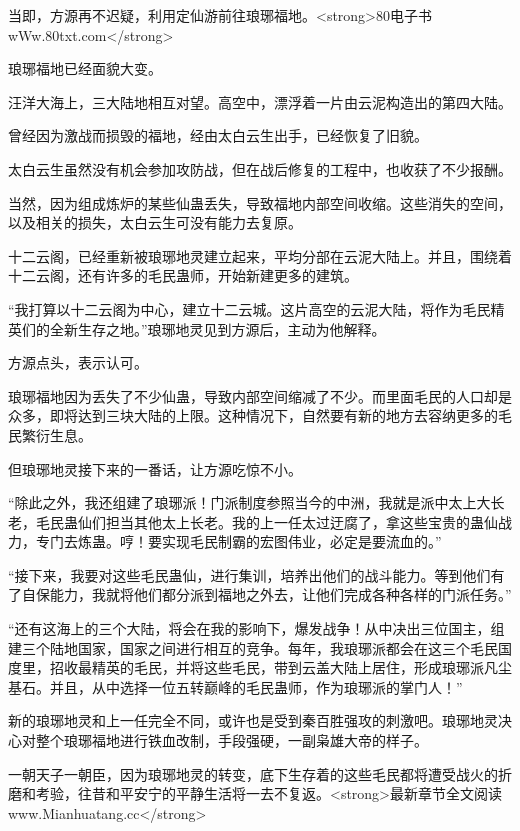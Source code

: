 
\begin{this_body}

当即，方源再不迟疑，利用定仙游前往琅琊福地。<strong>80电子书wWw.80txt.com</strong>

琅琊福地已经面貌大变。

汪洋大海上，三大陆地相互对望。高空中，漂浮着一片由云泥构造出的第四大陆。

曾经因为激战而损毁的福地，经由太白云生出手，已经恢复了旧貌。

太白云生虽然没有机会参加攻防战，但在战后修复的工程中，也收获了不少报酬。

当然，因为组成炼炉的某些仙蛊丢失，导致福地内部空间收缩。这些消失的空间，以及相关的损失，太白云生可没有能力去复原。

十二云阁，已经重新被琅琊地灵建立起来，平均分部在云泥大陆上。并且，围绕着十二云阁，还有许多的毛民蛊师，开始新建更多的建筑。

“我打算以十二云阁为中心，建立十二云城。这片高空的云泥大陆，将作为毛民精英们的全新生存之地。”琅琊地灵见到方源后，主动为他解释。

方源点头，表示认可。

琅琊福地因为丢失了不少仙蛊，导致内部空间缩减了不少。而里面毛民的人口却是众多，即将达到三块大陆的上限。这种情况下，自然要有新的地方去容纳更多的毛民繁衍生息。

但琅琊地灵接下来的一番话，让方源吃惊不小。

“除此之外，我还组建了琅琊派！门派制度参照当今的中洲，我就是派中太上大长老，毛民蛊仙们担当其他太上长老。我的上一任太过迂腐了，拿这些宝贵的蛊仙战力，专门去炼蛊。哼！要实现毛民制霸的宏图伟业，必定是要流血的。”

“接下来，我要对这些毛民蛊仙，进行集训，培养出他们的战斗能力。等到他们有了自保能力，我就将他们都分派到福地之外去，让他们完成各种各样的门派任务。”

“还有这海上的三个大陆，将会在我的影响下，爆发战争！从中决出三位国主，组建三个陆地国家，国家之间进行相互的竞争。每年，我琅琊派都会在这三个毛民国度里，招收最精英的毛民，并将这些毛民，带到云盖大陆上居住，形成琅琊派凡尘基石。并且，从中选择一位五转巅峰的毛民蛊师，作为琅琊派的掌门人！”

新的琅琊地灵和上一任完全不同，或许也是受到秦百胜强攻的刺激吧。琅琊地灵决心对整个琅琊福地进行铁血改制，手段强硬，一副枭雄大帝的样子。

一朝天子一朝臣，因为琅琊地灵的转变，底下生存着的这些毛民都将遭受战火的折磨和考验，往昔和平安宁的平静生活将一去不复返。<strong>最新章节全文阅读www.Mianhuatang.cc</strong>


\end{this_body}
